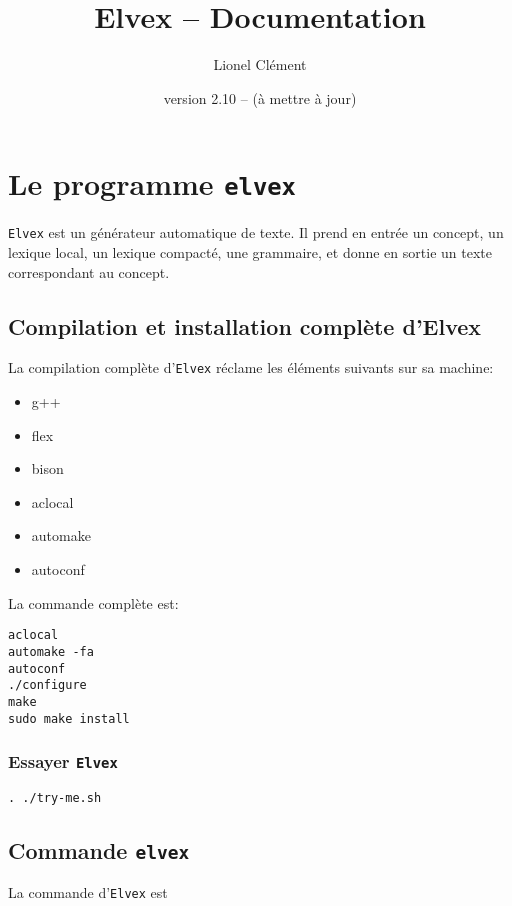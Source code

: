 \documentclass[11pt]{article}
\title{Elvex -- Documentation}
\author{Lionel Clément}
\date{version 2.10 -- (à mettre à jour)}
\begin{document}
\maketitle
\section{Le programme \texttt{elvex}}

\texttt{Elvex} est un générateur automatique de texte. Il prend en
entrée un concept, un lexique local, un lexique compacté, une
grammaire, et donne en sortie un texte correspondant au concept.

\subsection*{Compilation et installation complète d'Elvex}

La compilation complète d'\texttt{Elvex} réclame les éléments suivants sur sa machine:

\begin{itemize}
\item g++
\item flex
\item bison
\item aclocal
\item automake
\item autoconf
\end{itemize}

La commande complète est:

\begin{lstlisting}[frame=none, numbers=none]
aclocal
automake -fa
autoconf
./configure
make
sudo make install
\end{lstlisting}

\subsubsection{Essayer \texttt{Elvex}}

\begin{lstlisting}[frame=none, numbers=none]
. ./try-me.sh
\end{lstlisting}

\subsection{Commande \texttt{elvex}}

La commande d'\texttt{Elvex} est\\
\end{document}
